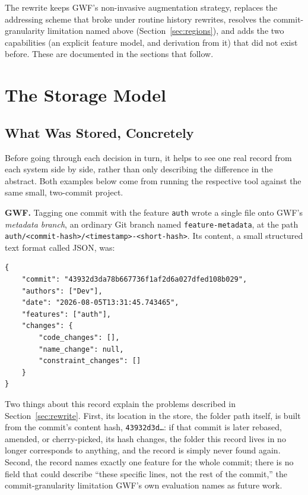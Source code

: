 \documentclass[11pt]{article}
\begin{document}
The rewrite keeps GWF's non-invasive augmentation strategy, replaces the
addressing scheme that broke under routine history rewrites, resolves the
commit-granularity limitation named above (Section~\ref{sec:regions}), and
adds the two capabilities (an explicit feature model, and derivation from
it) that did not exist before. These are documented in the sections that
follow.

\section{The Storage Model}
\label{sec:storage}

\subsection{What Was Stored, Concretely}
\label{sec:storage-example}

Before going through each decision in turn, it helps to see one real
record from each system side by side, rather than only describing the
difference in the abstract. Both examples below come from running the
respective tool against the same small, two-commit project.

\medskip\noindent\textbf{GWF.} Tagging one commit with the feature
\texttt{auth} wrote a single file onto GWF's \emph{metadata branch}, an
ordinary Git branch named \texttt{feature-metadata}, at the path
\nolinkurl{auth/<commit-hash>/<timestamp>-<short-hash>}. Its content, a
small structured text format called JSON, was:

\begin{verbatim}
{
    "commit": "43932d3da78b667736f1af2d6a027dfed108b029",
    "authors": ["Dev"],
    "date": "2026-08-05T13:31:45.743465",
    "features": ["auth"],
    "changes": {
        "code_changes": [],
        "name_change": null,
        "constraint_changes": []
    }
}
\end{verbatim}

Two things about this record explain the problems described in
Section~\ref{sec:rewrite}. First, its location in the store, the folder
path itself, is built from the commit's content hash,
\texttt{43932d3d\ldots}: if that commit is later rebased, amended, or
cherry-picked, its hash changes, the folder this record lives in no
longer corresponds to anything, and the record is simply never found
again. Second, the record names exactly one feature for the whole commit; there
is no field that could describe ``these specific lines, not the rest of
the commit,'' the commit-granularity limitation GWF's own evaluation
names as future work.
\end{document}
